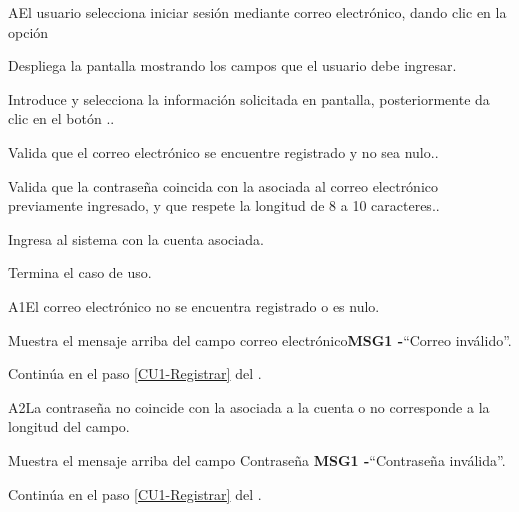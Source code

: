 		\begin{UCtrayectoriaA}{A}{El usuario selecciona iniciar sesión mediante correo electrónico, dando clic en la opción }
			
			\UCpaso Despliega la pantalla  mostrando los campos que el usuario debe ingresar.
			
			\UCpaso[\UCactor] Introduce y selecciona la información solicitada en pantalla, posteriormente da clic en el botón .\label{CU1-iniciar}.
			
			\UCpaso Valida que el correo electrónico se encuentre registrado y no sea nulo..

			\UCpaso Valida que la contraseña coincida con la asociada al correo electrónico previamente ingresado, y que respete la longitud de 8 a 10 caracteres..
			
			\UCpaso Ingresa al sistema con la cuenta asociada.
			
			\UCpaso Termina el caso de uso.
			
		\end{UCtrayectoriaA}
	
		\begin{UCtrayectoriaA}{A1}{El correo electrónico no se encuentra registrado o es nulo.}
		
		\UCpaso Muestra el mensaje arriba del campo correo electrónico{\bf MSG1 -}``Correo  inválido''.
		
		\UCpaso Continúa en el paso \ref{CU1-Registrar} del .
		
	\end{UCtrayectoriaA}

		\begin{UCtrayectoriaA}{A2}{La contraseña no coincide con la asociada a la cuenta o no corresponde a la longitud del campo.}
		
		\UCpaso Muestra el mensaje arriba del campo Contraseña {\bf MSG1 -}``Contraseña inválida''.
		
		\UCpaso Continúa en el paso \ref{CU1-Registrar} del .
		
	\end{UCtrayectoriaA}
		

